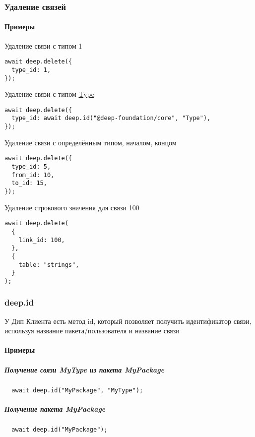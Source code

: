 \documentclass{article}
\begin{document}
\subsubsection{Удаление связей}

\paragraph{Примеры \\}

Удаление связи с типом 1

\leavevmode
\begin{lstlisting}
await deep.delete({
  type_id: 1,
});
\end{lstlisting}

Удаление связи с типом \hyperlink{Core.Type.Description}{Type}

\leavevmode
\begin{lstlisting}
await deep.delete({
  type_id: await deep.id("@deep-foundation/core", "Type"),
});
\end{lstlisting}

Удаление связи с определённым типом, началом, концом
\leavevmode
\begin{lstlisting}
await deep.delete({
  type_id: 5,
  from_id: 10,
  to_id: 15,
});
\end{lstlisting}

Удаление строкового значения для связи 100
\leavevmode
\begin{lstlisting}
await deep.delete(
  {
    link_id: 100,
  },
  {
    table: "strings",
  }
);
\end{lstlisting}

\subsubsection{deep.id}
У Дип Клиента есть метод id, который позволяет получить идентификатор связи,
используя название пакета/пользователя и название связи
\paragraph{Примеры}
\subparagraph{Получение связи MyType из пакета MyPackage}
\begin{lstlisting}
  await deep.id("MyPackage", "MyType");
\end{lstlisting}

\subparagraph{Получение пакета MyPackage}
\begin{lstlisting}
  await deep.id("MyPackage");
\end{lstlisting}
\end{document}
